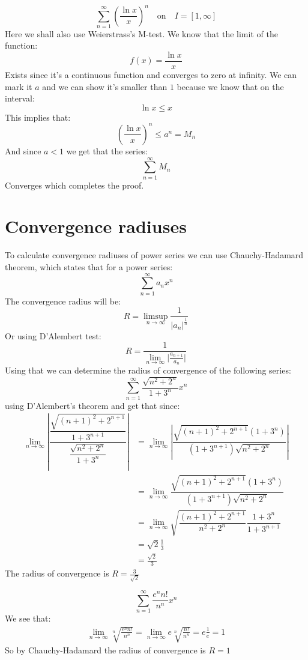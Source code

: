 \documentclass{article}
\theoremstyle{plain}
\begin{document}
	\newpage
	
	\[
	\sum_{n=1}^{\infty}{
	\left(\frac{\ln x}{x}\right)^n}\quad\text{on}\quad I=[1,\infty]
	\]
	Here we shall also use Weierstrass's M-test. We know that
	the limit of the function:
	\[
		f(x) = \frac{\ln x}{x}
	\]
	Exists since it's a continuous function and converges to zero at
	infinity. We can mark it $a$ and we can show it's smaller than $1$
	because we know that on the interval:
	\[
		\ln x \le x
	\]
	This implies that:
	\[
		\left(\frac{\ln x}{x}\right)^n \le a^n = M_n
	\]
	And since $a < 1$ we get that the series:
	\[
		\sum_{n=1}^{\infty}{M_n}
	\]
	Converges which completes the proof.
	
	\newpage
	
	\section{Convergence radiuses}
	
	To calculate convergence radiuses of power series we can use 
	Chauchy-Hadamard theorem, which states that for a power series:
	\[
		\sum_{n=1}^{\infty}{a_n x^n}
	\]
	The convergence radius will be:
	\[
		R = \limsup_{n\to\infty}{\frac{1}{\vert a_n \vert^{\frac 1n}}}
	\]
	Or using D'Alembert test:
	\[
		R = \frac{1}{\lim_{n\to\infty}{\vert\frac{a_{n+1}}{a_{n}}\vert}}
	\]
	Using that we can determine the radius of convergence of the following
	series:
	\[
		\sum_{n=1}^{\infty}{\frac{\sqrt{n^2+2^n}}{1+3^n}x^n}
	\]
	using D'Alembert's theorem and get that since:
	\begin{align*}
		\lim_{n\to\infty}
		{
			\left\vert \dfrac
			{\dfrac{\sqrt{(n+1)^2+2^{n+1}}}{1+3^{n+1}}}
			{\dfrac{\sqrt{n^2+2^n}}{1+3^n}} \right\vert
		} &= 
		\lim_{n\to\infty}
		{
			\left\vert \dfrac
			{\sqrt{(n+1)^2+2^{n+1}}(1+3^n)}{(1+3^{n+1})\sqrt{n^2+2^n}} 
			\right\vert
		} \\ &= 
		\lim_{n\to\infty}
		{
			\dfrac
			{\sqrt{(n+1)^2+2^{n+1}}(1+3^n)}{(1+3^{n+1})\sqrt{n^2+2^n}}
		} \\ &= 
		\lim_{n\to\infty}
		{
			\sqrt{\dfrac{(n+1)^2+2^{n+1}}{n^2+2^n}}
			\dfrac{1+3^n}{1+3^{n+1}}
		} \\ &= \sqrt{2} \frac{1}{3} 
		  \\ &= \frac{\sqrt{2}}{3}
	\end{align*}
	The radius of convergence is $R = \frac{3}{\sqrt{2}}$
	
	\newpage
	
	\[
		\sum_{n=1}^{\infty}{\frac{e^n n!}{n^n}x^n}
	\]
	We see that:
	\begin{align*}
		\lim_{n\to\infty}{\sqrt[n]{\frac{e^n n!}{n^n}}} = 
		\lim_{n\to\infty}{e \sqrt[n]{\frac{n!}{n^n}}} = e \frac{1}{e} = 1
	\end{align*}
	So by Chauchy-Hadamard the radius of convergence is $R = 1$
	
\end{document}
